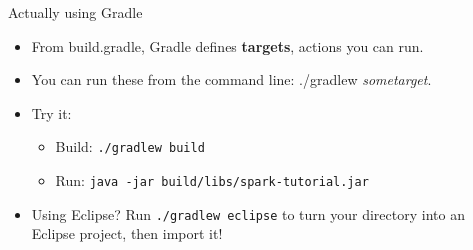 \begin{frame}{Actually using Gradle}
\begin{itemize}
    \item From build.gradle, Gradle defines \textbf{targets}, actions you can run.
    \item You can run these from the command line: ./gradlew \textit{sometarget}.
    \item Try it:
    \begin{itemize}
        \item Build: \texttt{./gradlew build}
        \item Run: \texttt{java -jar build/libs/spark-tutorial.jar}
    \end{itemize}
    \item Using Eclipse? Run \texttt{./gradlew eclipse} to turn your directory into an Eclipse project, then import it!
\end{itemize}
\end{frame}